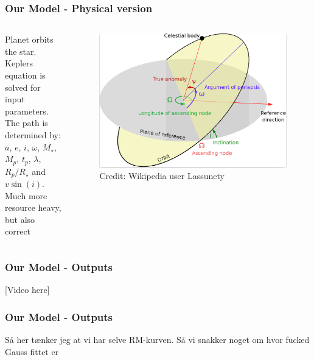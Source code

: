 \documentclass[show notes]{beamer}
\begin{document}
\begin{frame}
\frametitle{Our Model - Physical version}
\begin{columns}
		Planet orbits the star.\\
		
		Keplers equation is solved for input parameters.\\

		The path is determined by:\\
		 $ a $, $ e $, $ i $, $ \omega $, $ M_{\star} $, $ M_p $, $ t_p $, $ \lambda $, $ R_p/R_{\star} $ and $ v\sin(i) $.\\
		
		Much more resource heavy, but also correct
		
		\begin{figure}
			\centering
			\includegraphics[width=\textwidth]{../figures/kepler.png}
			\caption{Credit: Wikipedia user Lassuncty}
			\label{fig:orbit}
		\end{figure}
\end{columns}

\end{frame}


\begin{frame}
\frametitle{Our Model - Outputs}
	[Video here]
\end{frame}

\begin{frame}
\frametitle{Our Model - Outputs}

Så her tænker jeg at vi har selve RM-kurven. Så vi snakker noget om hvor fucked Gauss fittet er
\end{frame}
\end{document}
